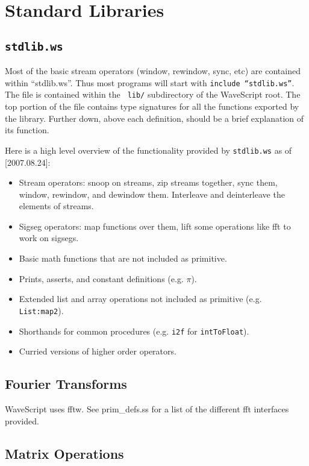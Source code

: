 
\chapter{Standard Libraries}

\section{{\tt stdlib.ws}}

Most of the basic stream operators (window, rewindow, sync, etc) are
contained within ``stdlib.ws''.  Thus most programs will start with
{\tt include ``stdlib.ws''}.  The file is contained within the {\tt
  lib/} subdirectory of the WaveScript root.
The top portion of the file contains type signatures for all the
functions exported by the library.  Further down, above each
definition, should be a brief explanation of its function.

Here is a high level overview of the functionality provided by
{\tt stdlib.ws} as of [2007.08.24]:

\begin{itemize}
\item Stream operators: snoop on streams, zip streams together, sync them, window,
  rewindow, and dewindow them.  Interleave and deinterleave the
  elements of streams.
\item Sigseg operators: map functions over them, lift some operations
  like fft to work on sigsegs.
\item Basic math functions that are not included as primitive.
\item Prints, asserts, and constant definitions (e.g. $\pi$).
\item Extended list and array operations not included as primitive (e.g. {\tt List:map2}).
\item Shorthands for common procedures (e.g. {\tt i2f} for {\tt intToFloat}).
\item Curried versions of higher order operators.
\end{itemize}


\section{Fourier Transforms}

WaveScript uses fftw.  See prim\_defs.ss for a list of the different
fft interfaces provided.




\section{Matrix Operations}

